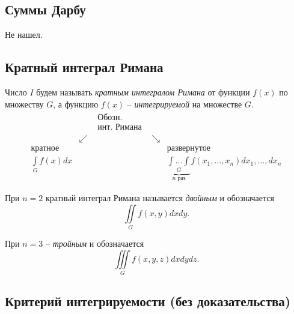 \subsection{Суммы Дарбу}

Не нашел.

\subsection{Кратный интеграл Римана}

\begin{note}
    Число $ I $ будем называть \emph{кратным интегралом Римана} от функции $ f(x) $ по множеству $ G $, а функцию $ f(x) $ -- \emph{интегрируемой} на множестве $ G $.
    \[
        \begin{array}{ccccc}
                                      &          & \begin{array}{cc}
                                                       \text{Обозн.} \\
                                                       \text{инт. Римана}
                                                   \end{array} &          &                                                                                                    \\
                                      & \swarrow &                    & \searrow &                                                                                             \\
            \text{кратное}            &          &                    &          & \text{развернутое}                                                                          \\
            \underset{G}{\int} f(x)dx &          &                    &          & \underbrace{\underset{G}{\int\ldots\int}}_{n \text{ раз}}f(x_1,\ldots,x_n)dx_1,\ldots,d x_n
        \end{array}
    \]

    При $ n=2 $ кратный интеграл Римана называется \emph{двойным} и обозначается
    \[
        \iint\limits_G f(x,y)dxdy.
    \]

    При $ n=3 $ -- \emph{тройным} и обозначается
    \[
        \iiint\limits_G f(x,y,z)dxdydz.
    \]
\end{note}

\subsection{Критерий интегрируемости (без доказательства)}

